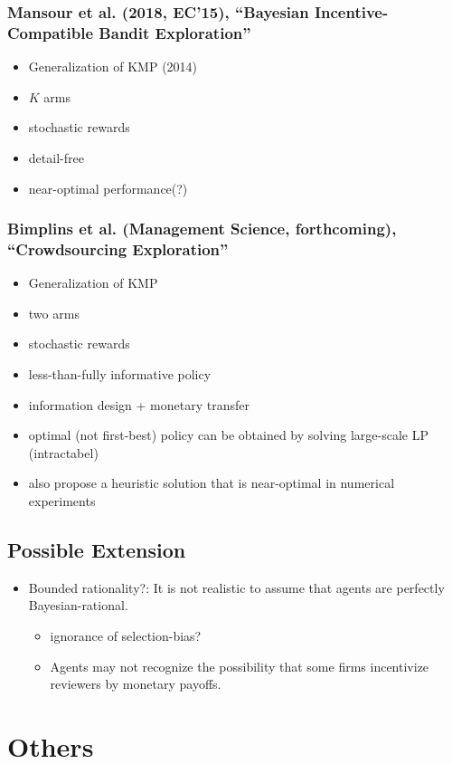 \documentclass[11pt,a4paper,dvipdfmx]{article}
\newcommand{\1}{\mathbbm{1}}
\begin{document}
\subsubsection{Mansour et al. (2018, EC'15), ``Bayesian Incentive-Compatible Bandit Exploration''}
\begin{itemize}
	\item Generalization of KMP (2014)
	\item $K$ arms
	\item stochastic rewards
	\item detail-free
	\item near-optimal performance(?)
\end{itemize}

\subsubsection{Bimplins et al. (Management Science,  forthcoming), ``Crowdsourcing Exploration''}
\begin{itemize}
	\item Generalization of KMP
	\item two arms
	\item stochastic rewards
	\item less-than-fully informative policy
	\item information design + monetary transfer
	\item optimal (not first-best) policy can be obtained by solving large-scale LP (intractabel)
	\item also propose a heuristic solution that is near-optimal in numerical experiments
\end{itemize}


\subsection{Possible Extension}
\begin{itemize}
	\item Bounded rationality?: It is not realistic to assume that agents are perfectly Bayesian-rational.
	\begin{itemize}
		\item ignorance of selection-bias?
		\item Agents may not recognize the possibility that some firms incentivize reviewers by monetary payoffs.
	\end{itemize}
\end{itemize}

\section{Others}
\end{document}
